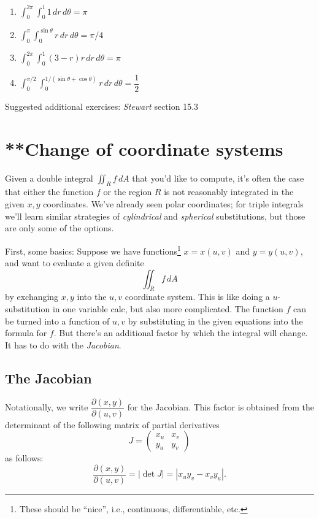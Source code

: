\documentclass[12pt]{article}
\numberwithin{equation}{subsection}
\numberwithin{figure}{subsection}
\theoremstyle{note}
\begin{document}
{\begin{enumerate}[label=\arabic*.]
\begin{enumerate}
	\item $\displaystyle \int_0^{2\pi} \int_0^1 1 \,dr\, d\theta=\pi$
	\item $\displaystyle \int_0^{\pi} \int_0^{\sin \theta} r \,dr \, d\theta=\pi/4$
	\item $\displaystyle \int_0^{2\pi} \int_0^1(3-r)r \,d{r}\,d\theta=\pi$
	\item $\displaystyle \int_0^{\pi/2} \int_0^{1/(\sin\theta+\cos\theta)}r \,d{r}\,d\theta=\dfrac{1}{2}$
\end{enumerate}

\end{enumerate}
Suggested additional exercises: \textit{Stewart} section 15.3







\section{**Change of coordinate systems}

Given a double integral $\iint_R f\,dA$ that you'd like to compute, it's often the case that either the function $f$ or the region $R$ is not reasonably integrated in the given $x,y$ coordinates. We've already seen polar coordinates; for triple integrals we'll learn similar strategies of \textit{cylindrical} and \textit{spherical} substitutions, but those are only some of the options. 

First, some basics: Suppose we have functions\footnote{These should be ``nice'', i.e., continuous, differentiable, etc.} $x=x(u,v)$ and $y=y(u,v)$, and want to evaluate a given definite \[\iint_R f\,dA\] by exchanging $x,y$ into the $u,v$ coordinate system. This is like doing a $u$-substitution in one variable calc, but also more complicated. The function $f$ can be turned into a function of $u,v$ by substituting in the given equations into the formula for $f$. But there's an additional factor by which the integral will change. It has to do with the \textit{Jacobian}. 

\subsection{The Jacobian}\label{jacobian-def}
Notationally, we write $\dfrac{\partial(x,y)}{\partial(u,v)}$ for the Jacobian. This factor is obtained from the determinant of the following matrix of partial derivatives
\begin{equation} J= \begin{pmatrix} x_u & x_v \\ y_u & y_v \end{pmatrix}\end{equation}
as follows: \begin{equation} \dfrac{\partial(x,y)}{\partial(u,v)} =|\det J|= |x_u y_v - x_v y_u|.\end{equation}

}
\end{document}
